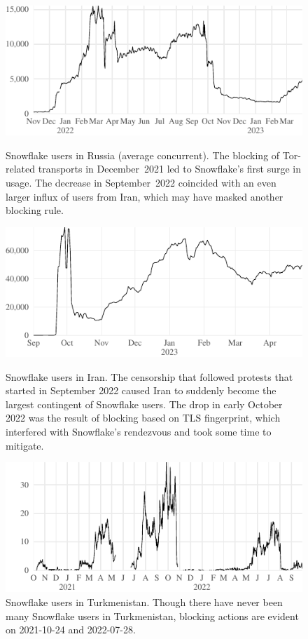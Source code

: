 \documentclass[letterpaper,twocolumn]{article}
\begin{document}
\begin{figure}[t!]
\includegraphics{figures/users/users-ru}
\caption{
Snowflake users in Russia (average concurrent).
The blocking of Tor-related transports in December~2021
led to Snowflake's first surge in usage.
The decrease in September~2022
coincided with an even larger influx of users from Iran,
which may have masked another blocking rule.
}
\label{fig:user-counts-ru}
\bigskip
\includegraphics{figures/users/users-ir}
\caption{
Snowflake users in Iran.
The censorship that followed
protests that started in September 2022
caused Iran to suddenly become the largest contingent of Snowflake users.
The drop in early October 2022
was the result of blocking based on TLS fingerprint,
which interfered with Snowflake's rendezvous
and took some time to mitigate.
}
\label{fig:user-counts-ir}
\bigskip
\includegraphics{figures/users/users-tm}
\caption{
Snowflake users in Turkmenistan.
Though there have never been many Snowflake users in Turkmenistan,
blocking actions are evident on
\mbox{2021-10-24} and \mbox{2022-07-28}.
}
\label{fig:user-counts-tm}
\end{figure}
\end{document}
